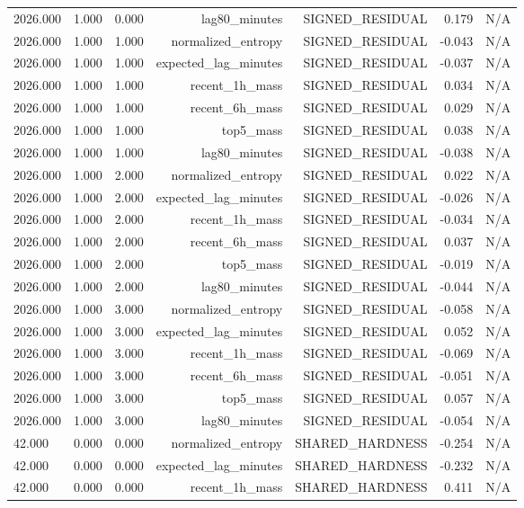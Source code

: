 \begin{table}[h!]
\begin{tabular}{lrrrrrr}
2026.000 & 1.000 & 0.000 & lag80\_minutes & SIGNED\_RESIDUAL & 0.179 & N/A \\
2026.000 & 1.000 & 1.000 & normalized\_entropy & SIGNED\_RESIDUAL & -0.043 & N/A \\
2026.000 & 1.000 & 1.000 & expected\_lag\_minutes & SIGNED\_RESIDUAL & -0.037 & N/A \\
2026.000 & 1.000 & 1.000 & recent\_1h\_mass & SIGNED\_RESIDUAL & 0.034 & N/A \\
2026.000 & 1.000 & 1.000 & recent\_6h\_mass & SIGNED\_RESIDUAL & 0.029 & N/A \\
2026.000 & 1.000 & 1.000 & top5\_mass & SIGNED\_RESIDUAL & 0.038 & N/A \\
2026.000 & 1.000 & 1.000 & lag80\_minutes & SIGNED\_RESIDUAL & -0.038 & N/A \\
2026.000 & 1.000 & 2.000 & normalized\_entropy & SIGNED\_RESIDUAL & 0.022 & N/A \\
2026.000 & 1.000 & 2.000 & expected\_lag\_minutes & SIGNED\_RESIDUAL & -0.026 & N/A \\
2026.000 & 1.000 & 2.000 & recent\_1h\_mass & SIGNED\_RESIDUAL & -0.034 & N/A \\
2026.000 & 1.000 & 2.000 & recent\_6h\_mass & SIGNED\_RESIDUAL & 0.037 & N/A \\
2026.000 & 1.000 & 2.000 & top5\_mass & SIGNED\_RESIDUAL & -0.019 & N/A \\
2026.000 & 1.000 & 2.000 & lag80\_minutes & SIGNED\_RESIDUAL & -0.044 & N/A \\
2026.000 & 1.000 & 3.000 & normalized\_entropy & SIGNED\_RESIDUAL & -0.058 & N/A \\
2026.000 & 1.000 & 3.000 & expected\_lag\_minutes & SIGNED\_RESIDUAL & 0.052 & N/A \\
2026.000 & 1.000 & 3.000 & recent\_1h\_mass & SIGNED\_RESIDUAL & -0.069 & N/A \\
2026.000 & 1.000 & 3.000 & recent\_6h\_mass & SIGNED\_RESIDUAL & -0.051 & N/A \\
2026.000 & 1.000 & 3.000 & top5\_mass & SIGNED\_RESIDUAL & 0.057 & N/A \\
2026.000 & 1.000 & 3.000 & lag80\_minutes & SIGNED\_RESIDUAL & -0.054 & N/A \\
42.000 & 0.000 & 0.000 & normalized\_entropy & SHARED\_HARDNESS & -0.254 & N/A \\
42.000 & 0.000 & 0.000 & expected\_lag\_minutes & SHARED\_HARDNESS & -0.232 & N/A \\
42.000 & 0.000 & 0.000 & recent\_1h\_mass & SHARED\_HARDNESS & 0.411 & N/A \\

\end{tabular}
\end{table}
